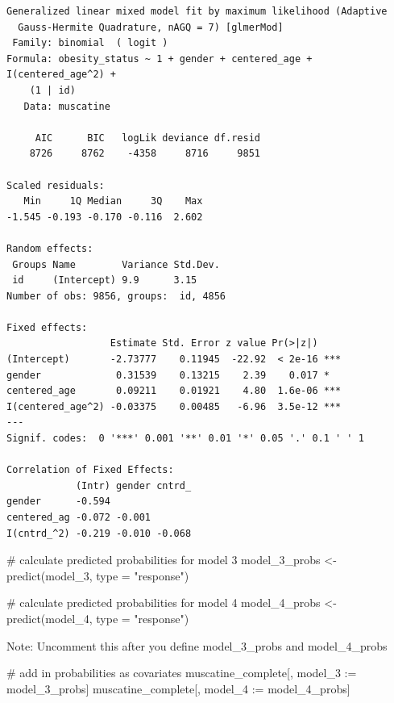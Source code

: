 \documentclass[
  letterpaper,
  DIV=11,
  numbers=noendperiod]{scrreprt}
\newenvironment{Shaded}{\begin{snugshade}}{\end{snugshade}}
\newcommand{\AttributeTok}[1]{\textcolor[rgb]{0.40,0.45,0.13}{#1}}
\newcommand{\CommentTok}[1]{\textcolor[rgb]{0.37,0.37,0.37}{#1}}
\newcommand{\ErrorTok}[1]{\textcolor[rgb]{0.68,0.00,0.00}{#1}}
\newcommand{\FunctionTok}[1]{\textcolor[rgb]{0.28,0.35,0.67}{#1}}
\newcommand{\NormalTok}[1]{\textcolor[rgb]{0.00,0.23,0.31}{#1}}
\newcommand{\OtherTok}[1]{\textcolor[rgb]{0.00,0.23,0.31}{#1}}
\newcommand{\SpecialCharTok}[1]{\textcolor[rgb]{0.37,0.37,0.37}{#1}}
\newcommand{\StringTok}[1]{\textcolor[rgb]{0.13,0.47,0.30}{#1}}
\begin{document}
\begin{verbatim}
Generalized linear mixed model fit by maximum likelihood (Adaptive
  Gauss-Hermite Quadrature, nAGQ = 7) [glmerMod]
 Family: binomial  ( logit )
Formula: obesity_status ~ 1 + gender + centered_age + I(centered_age^2) +  
    (1 | id)
   Data: muscatine

     AIC      BIC   logLik deviance df.resid 
    8726     8762    -4358     8716     9851 

Scaled residuals: 
   Min     1Q Median     3Q    Max 
-1.545 -0.193 -0.170 -0.116  2.602 

Random effects:
 Groups Name        Variance Std.Dev.
 id     (Intercept) 9.9      3.15    
Number of obs: 9856, groups:  id, 4856

Fixed effects:
                  Estimate Std. Error z value Pr(>|z|)    
(Intercept)       -2.73777    0.11945  -22.92  < 2e-16 ***
gender             0.31539    0.13215    2.39    0.017 *  
centered_age       0.09211    0.01921    4.80  1.6e-06 ***
I(centered_age^2) -0.03375    0.00485   -6.96  3.5e-12 ***
---
Signif. codes:  0 '***' 0.001 '**' 0.01 '*' 0.05 '.' 0.1 ' ' 1

Correlation of Fixed Effects:
            (Intr) gender cntrd_
gender      -0.594              
centered_ag -0.072 -0.001       
I(cntrd_^2) -0.219 -0.010 -0.068
\end{verbatim}

\begin{Shaded}
\begin{Highlighting}[]
\CommentTok{\# calculate predicted probabilities for model 3}
\NormalTok{model\_3\_probs }\OtherTok{\textless{}{-}} \FunctionTok{predict}\NormalTok{(model\_3, }\AttributeTok{type =} \StringTok{"response"}\NormalTok{)}

\CommentTok{\# calculate predicted probabilities for model 4}
\NormalTok{model\_4\_probs }\OtherTok{\textless{}{-}} \FunctionTok{predict}\NormalTok{(model\_4, }\AttributeTok{type =} \StringTok{"response"}\NormalTok{)}
\end{Highlighting}
\end{Shaded}

Note: Uncomment this after you define model\_3\_probs and
model\_4\_probs

\begin{Shaded}
\begin{Highlighting}[]
\CommentTok{\# add in probabilities as covariates}
\NormalTok{muscatine\_complete[, model\_3 }\SpecialCharTok{:}\ErrorTok{=}\NormalTok{ model\_3\_probs]}
\NormalTok{muscatine\_complete[, model\_4 }\SpecialCharTok{:}\ErrorTok{=}\NormalTok{ model\_4\_probs]}
\end{Highlighting}
\end{Shaded}
\end{document}
